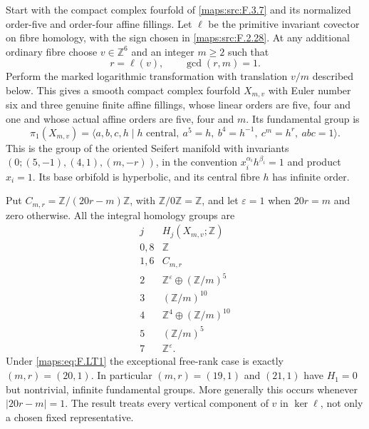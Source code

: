\begin{theorem}\label{maps:src:F.2.32}


Start with the compact complex fourfold of \ref{maps:src:F.3.7} and its
normalized order-five and order-four affine fillings.
Let $\ell$ be the primitive invariant covector on fibre
homology, with the sign chosen in \ref{maps:src:F.2.28}.
At any additional ordinary fibre choose
$v\in\mathbb Z^6$ and an integer $m\ge2$ such that
\[
 r=\ell(v),\qquad \gcd(r,m)=1.
\tag{F.LT1}\label{maps:eq:F.LT1}
\]
Perform the marked logarithmic transformation with
translation $v/m$ described below.
This gives a smooth compact complex fourfold $X_{m,v}$
with Euler number six and three genuine finite affine
fillings, whose linear orders are five, four and one
and whose actual affine orders are five, four and $m$.
Its fundamental group is
\[
 \pi_1(X_{m,v})=
 \langle a,b,c,h\mid h\text{ central},\
   a^5=h,\ b^4=h^{-1},\ c^m=h^r,\ abc=1\rangle .
\tag{F.LT2}\label{maps:eq:F.LT2}
\]
This is the group of the oriented Seifert manifold
with invariants
$(0;(5,-1),(4,1),(m,-r))$, in the convention
$x_i^{\alpha_i}h^{\beta_i}=1$ and product $x_i=1$.
Its base orbifold is hyperbolic, and its central fibre
$h$ has infinite order.

Put $C_{m,r}=\mathbb Z/(20r-m)\mathbb Z$, with
$\mathbb Z/0\mathbb Z=\mathbb Z$, and let
$\varepsilon=1$ when $20r=m$ and zero otherwise.
All the integral homology groups are
\[
\begin{array}{c|c}
j&H_j(X_{m,v};\mathbb Z)\\ \hline
0,8&\mathbb Z\\
1,6&C_{m,r}\\
2&\mathbb Z^\varepsilon\oplus(\mathbb Z/m)^5\\
3&(\mathbb Z/m)^{10}\\
4&\mathbb Z^4\oplus(\mathbb Z/m)^{10}\\
5&(\mathbb Z/m)^5\\
7&\mathbb Z^\varepsilon .
\end{array}
\tag{F.LT3}\label{maps:eq:F.LT3}
\]
Under \eqref{maps:eq:F.LT1} the exceptional free-rank case is exactly
$(m,r)=(20,1)$.
In particular $(m,r)=(19,1)$ and $(21,1)$ have
$H_1=0$ but nontrivial, infinite fundamental groups.
More generally this occurs whenever $|20r-m|=1$.
The result treats every vertical component of $v$
in $\ker\ell$, not only a chosen fixed representative.

\end{theorem}


